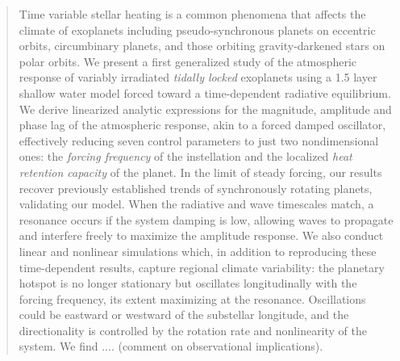 \documentclass[trackchanges,twocolumn]{aastex7}
\begin{document}
\begin{abstract}

Time variable stellar heating is a common phenomena that affects the climate of exoplanets including pseudo-synchronous planets on eccentric orbits, circumbinary planets, and those orbiting gravity-darkened stars on polar orbits. We present a first generalized study of the atmospheric response of variably irradiated \textit{tidally locked} exoplanets using a 1.5 layer shallow water model forced toward a time-dependent radiative equilibrium. We derive linearized analytic expressions for the magnitude, amplitude and phase lag of the atmospheric response, akin to a forced damped oscillator,  effectively reducing seven control parameters to just two nondimensional ones: the \textit{forcing frequency} of the instellation and the localized \textit{heat retention capacity} of the planet. In the limit of steady forcing, our results recover previously established trends of synchronously rotating planets, validating our model. When the radiative and wave timescales match, a resonance occurs if the system damping is low, allowing waves to propagate and interfere freely to maximize the amplitude response. We also conduct linear and nonlinear simulations which, in addition to reproducing these time-dependent results, capture regional climate variability: the planetary hotspot is no longer stationary but oscillates longitudinally with the forcing frequency, its extent maximizing at the resonance. Oscillations could be eastward or westward of the substellar longitude, and the directionality is controlled by the rotation rate and nonlinearity of the system. We find .... (comment on observational implications).

\end{abstract}

\end{document}
